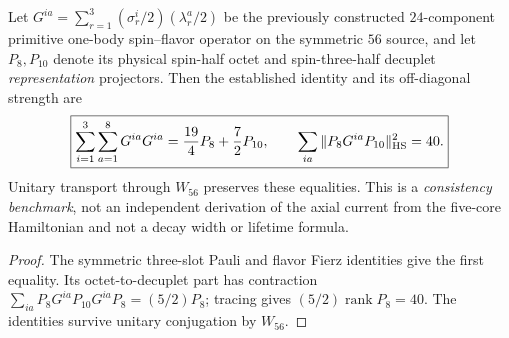 \documentclass[12pt,a4paper]{article}
\begin{document}
\begin{corollary}
\label{p11:cor:v369-axial-transition-benchmark}
Let $G^{ia}=\sum_{r=1}^3(\sigma_r^i/2)(\lambda_r^a/2)$ be the
previously constructed $24$-component primitive one-body
spin--flavor operator on the symmetric $56$ source, and let
$P_8,P_{10}$ denote its physical spin-half octet and spin-three-half
decuplet \emph{representation} projectors.  Then the established
identity and its off-diagonal strength are
\[
 \boxed{\sum_{i=1}^3\sum_{a=1}^8G^{ia}G^{ia}
 ={19\over4}P_8+{7\over2}P_{10},\qquad
 \sum_{ia}\|P_8G^{ia}P_{10}\|_{\rm HS}^2=40.}
\]
Unitary transport through $W_{56}$ preserves these equalities.
This is a \emph{consistency benchmark}, not an independent derivation
of the axial current from the five-core Hamiltonian and not a decay
width or lifetime formula.
\end{corollary}
\begin{proof}
The symmetric three-slot Pauli and flavor Fierz identities give the
first equality.  Its octet-to-decuplet part has contraction
$\sum_{ia}P_8G^{ia}P_{10}G^{ia}P_8=(5/2)P_8$;
tracing gives $(5/2)\operatorname{rank}P_8=40$.
The identities survive unitary conjugation by $W_{56}$.
\end{proof}
\end{document}
